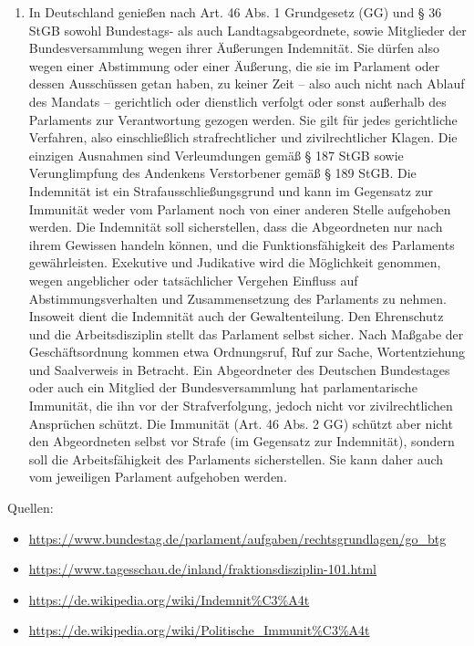 \documentclass{article}
\begin{document}
\begin{enumerate}[label=(\alph*)]
		\item In Deutschland genießen nach Art. 46 Abs. 1 Grundgesetz (GG) und § 36 StGB sowohl Bundestags- als auch Landtagsabgeordnete, sowie Mitglieder der Bundesversammlung wegen ihrer Äußerungen Indemnität. Sie dürfen also wegen einer Abstimmung oder einer Äußerung, die sie im Parlament oder dessen Ausschüssen getan haben, zu keiner Zeit – also auch nicht nach Ablauf des Mandats – gerichtlich oder dienstlich verfolgt oder sonst außerhalb des Parlaments zur Verantwortung gezogen werden. Sie gilt für jedes gerichtliche Verfahren, also einschließlich strafrechtlicher und zivilrechtlicher Klagen. Die einzigen Ausnahmen sind Verleumdungen gemäß § 187 StGB sowie Verunglimpfung des Andenkens Verstorbener gemäß § 189 StGB. Die Indemnität ist ein Strafausschließungsgrund und kann im Gegensatz zur Immunität weder vom Parlament noch von einer anderen Stelle aufgehoben werden. Die Indemnität soll sicherstellen, dass die Abgeordneten nur nach ihrem Gewissen handeln können, und die Funktionsfähigkeit des Parlaments gewährleisten. Exekutive und Judikative wird die Möglichkeit genommen, wegen angeblicher oder tatsächlicher Vergehen Einfluss auf Abstimmungsverhalten und Zusammensetzung des Parlaments zu nehmen. Insoweit dient die Indemnität auch der Gewaltenteilung. Den Ehrenschutz und die Arbeitsdisziplin stellt das Parlament selbst sicher. Nach Maßgabe der Geschäftsordnung kommen etwa Ordnungsruf, Ruf zur Sache, Wortentziehung und Saalverweis in Betracht. Ein Abgeordneter des Deutschen Bundestages oder auch ein Mitglied der Bundesversammlung hat parlamentarische Immunität, die ihn vor der Strafverfolgung, jedoch nicht vor zivilrechtlichen Ansprüchen schützt. Die Immunität (Art. 46 Abs. 2 GG) schützt aber nicht den Abgeordneten selbst vor Strafe (im Gegensatz zur Indemnität), sondern soll die Arbeitsfähigkeit des Parlaments sicherstellen. Sie kann daher auch vom jeweiligen Parlament aufgehoben werden.
	\end{enumerate}

	Quellen:
	\begin{itemize}
		\item \url{https://www.bundestag.de/parlament/aufgaben/rechtsgrundlagen/go_btg}
		\item \url{https://www.tagesschau.de/inland/fraktionsdisziplin-101.html}
		\item \url{https://de.wikipedia.org/wiki/Indemnit%C3%A4t}
		\item \url{https://de.wikipedia.org/wiki/Politische_Immunit%C3%A4t}
	\end{itemize}
\end{document}
